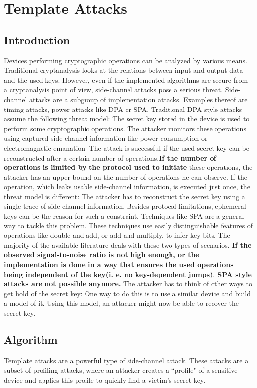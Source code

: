 \newpage
\section{Template Attacks} 
\subsection{Introduction}
    Devices performing cryptographic operations can be analyzed by various
    means. Traditional cryptanalysis looks at the relations between input and
    output data and the used keys. However, even if the implemented algorithms
    are secure from a cryptanalysis point of view, side-channel attacks pose a
    serious threat. Side-channel attacks are a subgroup of implementation
    attacks. Examples thereof are timing attacks, power attacks like DPA or SPA.
    Traditional DPA style attacks assume the following threat model: The secret
    key stored in the device is used to perform some cryptographic operations.
    The attacker monitors these operations using captured side-channel
    information like power consumption or electromagnetic emanation. The attack
    is successful if the used secret key can be reconstructed after a certain
    number of operations.\textbf{If the number of operations is limited by the
    protocol used to initiate} these operations, the attacker has an upper bound
    on the number of operations he can observe. If the operation, which leaks
    usable side-channel information, is executed just once, the threat model is
    different: The attacker has to reconstruct the secret key using a single
    trace of side-channel information. Besides protocol limitations, ephemeral
    keys can be the reason for such a constraint. Techniques like SPA are a
    general way to tackle this problem. These techniques use easily
    distinguishable features of operations like double and add, or add and
    multiply, to infer key-bits. The majority of the available literature deals
    with these two types of scenarios. \textbf{If the observed signal-to-noise
    ratio is not high enough, or the implementation is done in a way that
    ensures the used operations being independent of the key(i. e. no
    key-dependent jumps), SPA style attacks are not possible anymore.} The
    attacker has to think of other ways to get hold of the secret key: One way
    to do this is to use a similar device and build a model of it. Using this
    model, an attacker might now be able to recover the secret key.
    
\subsection{Algorithm}
    Template attacks are a powerful type of side-channel attack. These attacks
    are a subset of profiling attacks, where an attacker creates a ``profile" of
    a sensitive device and applies this profile to quickly find a victim's
    secret key.
    

